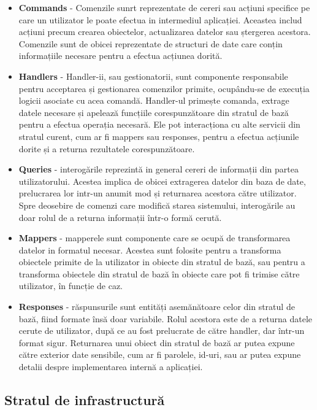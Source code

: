 \begin{itemize}
    \item \textbf{Commands} - Comenzile sunrt reprezentate de cereri sau acțiuni specifice pe care un utilizator le poate efectua in intermediul aplicației. Aceastea includ acțiuni precum crearea obiectelor, actualizarea datelor sau ștergerea acestora. Comenzile sunt de obicei reprezentate de structuri de date care conțin informațiile necesare pentru a efectua acțiunea dorită.
    \item \textbf{Handlers} - Handler-ii, sau gestionatorii, sunt componente responsabile pentru acceptarea și gestionarea comenzilor primite, ocupându-se de execuția logicii asociate cu acea comandă. Handler-ul primește comanda, extrage datele necesare și apelează funcțiile corespunzătoare din stratul de bază pentru a efectua operația necesară. Ele pot interacționa cu alte servicii din stratul curent, cum ar fi mappers sau responses, pentru a efectua acțiunile dorite și a returna rezultatele corespunzătoare.
    \item \textbf{Queries} - interogările reprezintă in general cereri de informații din partea utilizatorului. Acestea implica de obicei extragerea datelor din baza de date, prelucrarea lor intr-un anumit mod și returnarea acestora către utilizator. Spre deosebire de comenzi care modifică starea sistemului, interogările au doar rolul de a returna informații într-o formă cerută.
    \item \textbf{Mappers} - mapperele sunt componente care se ocupă de transformarea datelor in formatul necesar. Acestea sunt folosite pentru a transforma obiectele primite de la utilizator in obiecte din stratul de bază, sau pentru a transforma obiectele din stratul de bază în obiecte care pot fi trimise către utilizator, în funcție de caz.
    
    \newpage

    \item \textbf{Responses} - răspunsurile sunt entități asemănătoare celor din stratul de bază, fiind formate însă doar variabile. Rolul acestora este de a returna datele cerute de utilizator, după ce au fost prelucrate de către handler, dar într-un format sigur. Returnarea unui obiect din stratul de bază ar putea expune către exterior date sensibile, cum ar fi parolele, id-uri, sau ar putea expune detalii despre implementarea internă a aplicației.
\end{itemize}

\subsection{Stratul de infrastructură}

